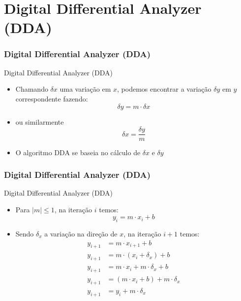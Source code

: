 \documentclass{beamer}
\begin{document}
\section{Digital Differential Analyzer (DDA) }
\begin{frame}
\frametitle{Digital Differential Analyzer (DDA)}

		\begin{block}{Digital Differential Analyzer (DDA)}
		\begin{itemize}
			\item Chamando $\delta x$ uma variação em $x$, podemos encontrar a variação $\delta y$ em $y$ correspondente fazendo:
			\begin{equation*}
				\delta y = m \cdot \delta x
			\end{equation*}
			\item ou similarmente
				\begin{equation*}
					\delta x = \frac{\delta y}{m}
				\end{equation*}
			\item O algoritmo DDA se baseia no cálculo de $\delta x$ e $\delta y$
		\end{itemize}
	\end{block}
	
\end{frame}

\begin{frame}
\frametitle{Digital Differential Analyzer (DDA)}

		\begin{block}{Digital Differential Analyzer (DDA)}
		\begin{itemize}
			\item Para $|m| \leq 1$, na iteração $i$ temos:
				\begin{equation*}
					y_i = m \cdot x_i + b
				\end{equation*}
			\item Sendo $\delta_x$ a variação na direção de $x$, na iteração $i+1$ temos:
				\begin{align*}
					y_{i+1} &= m \cdot x_{i+1} + b \\
					y_{i+1} &= m \cdot (x_i + \delta_x) + b \\
					y_{i+1} &= m \cdot x_{i} + m \cdot \delta_x + b \\
					y_{i+1} &= (m \cdot x_{i} +b) + m \cdot \delta_x\\
					y_{i+1} &= y_i + m \cdot \delta_x
				\end{align*}
		\end{itemize}
	\end{block}
	
\end{frame}
\end{document}
